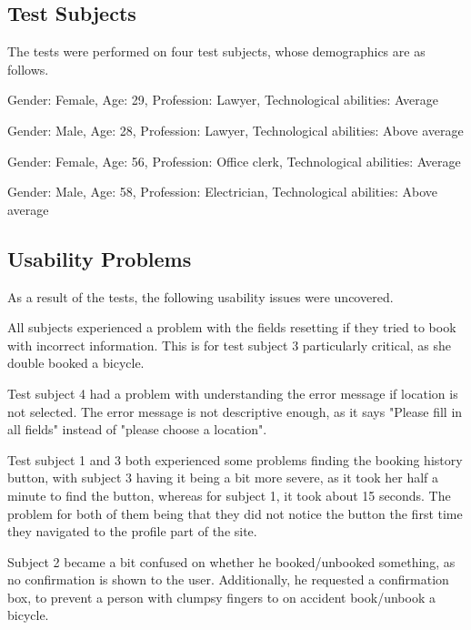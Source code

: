 \subsection{Test Subjects}
The tests were performed on four test subjects, whose demographics are as follows.
\begin{description}[style=nextline]
\item[Subject 1]
Gender: Female, Age: 29, Profession: Lawyer, Technological abilities: Average
\item[Subject 2]
Gender: Male, Age: 28, Profession: Lawyer, Technological abilities: Above average
\item[Subject 3]
Gender: Female, Age: 56, Profession: Office clerk, Technological abilities: Average
\item[Subject 4]
Gender: Male, Age: 58, Profession: Electrician, Technological abilities: Above average
\end{description}

\subsection{Usability Problems}
As a result of the tests, the following usability issues were uncovered.

\begin{description}[style=nextline]
	\item[{\#}1 Fields reset]
		All subjects experienced a problem with the fields resetting if they tried to book with incorrect information.
		This is for test subject 3 particularly critical, as she double booked a bicycle.
	\item[{\#}2 Error message understandability] Test subject 4 had a problem with understanding the error message if location is not selected.
	The error message is not descriptive enough, as it says "Please fill in all fields" instead of "please choose a location".
	\item[{\#}3 Difficulty finding history] Test subject 1 and 3 both experienced some problems finding the booking history button, with subject 3 having it being a bit more severe, as it took her half a minute to find the button, whereas for subject 1, it took about 15 seconds. 
	The problem for both of them being that they did not notice the button the first time they navigated to the profile part of the site.
	\item[{\#}4 Booking/Unbooking confirmation] Subject 2 became a bit confused on whether he booked/unbooked something, as no confirmation is shown to the user.
	Additionally, he requested a confirmation box, to prevent a person with clumpsy fingers to on accident book/unbook a bicycle.
\end{description}

